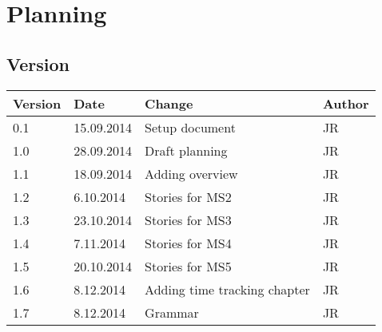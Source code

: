 


\chapter{Planning} %

\label{Planning} %



\section{Version}

\begin{tabular}{| p{1.5cm} | p{2cm} | p{9cm} | p{1.5cm} |}
    \hline
    Version & Date      & Change & Author \\ \hline
    0.1     & 15.09.2014        & Setup document                                        & JR \\ \hline
    1.0     & 28.09.2014        & Draft planning                                        & JR \\ \hline
    1.1     & 18.09.2014        & Adding overview                                       & JR \\ \hline
    1.2     & 6.10.2014        & Stories for MS2                                       & JR \\ \hline
    1.3     & 23.10.2014        & Stories for MS3                                      & JR \\ \hline
    1.4     & 7.11.2014        & Stories for MS4                                       & JR \\ \hline
    1.5     & 20.10.2014        & Stories for MS5                                       & JR \\ \hline
    1.6       & 8.12.2014        & Adding time tracking chapter                      & JR \\ \hline
    1.7       & 8.12.2014        & Grammar                                            & JR \\ \hline


\end{tabular}

